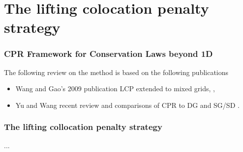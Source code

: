 \section{The lifting colocation penalty strategy}

\begin{frame} \frametitle{CPR Framework for Conservation Laws beyond 1D}
 The following review on the method is based on the following publications
 \begin{itemize}
  \item Wang and Gao's 2009 publication LCP extended to mixed grids, \cite{Wang&Gao2009},
  \item Yu and Wang recent review and comparisons of CPR to DG and SG/SD \cite{Yu&Wang2013}.
 \end{itemize}
\end{frame}

\begin{frame} \frametitle{The lifting collocation penalty strategy}
	...
\end{frame}